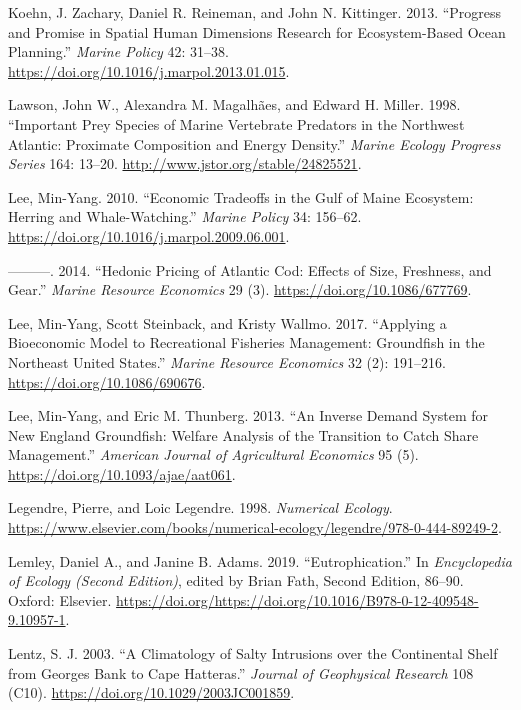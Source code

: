 \documentclass[
]{book}
\newlength{\cslhangindent}
\newenvironment{cslreferences}%
  {\setlength{\parindent}{0pt}%
  \everypar{\setlength{\hangindent}{\cslhangindent}}\ignorespaces}%
  {\par}
\begin{document}
\begin{cslreferences}
\leavevmode\hypertarget{ref-koehn_progress_2013}{}%
Koehn, J. Zachary, Daniel R. Reineman, and John N. Kittinger. 2013. ``Progress and Promise in Spatial Human Dimensions Research for Ecosystem-Based Ocean Planning.'' \emph{Marine Policy} 42: 31--38. \url{https://doi.org/10.1016/j.marpol.2013.01.015}.

\leavevmode\hypertarget{ref-lawson1998}{}%
Lawson, John W., Alexandra M. Magalhães, and Edward H. Miller. 1998. ``Important Prey Species of Marine Vertebrate Predators in the Northwest Atlantic: Proximate Composition and Energy Density.'' \emph{Marine Ecology Progress Series} 164: 13--20. \url{http://www.jstor.org/stable/24825521}.

\leavevmode\hypertarget{ref-lee_economic_2010}{}%
Lee, Min-Yang. 2010. ``Economic Tradeoffs in the Gulf of Maine Ecosystem: Herring and Whale-Watching.'' \emph{Marine Policy} 34: 156--62. \url{https://doi.org/10.1016/j.marpol.2009.06.001}.

\leavevmode\hypertarget{ref-lee_hedonic_2014}{}%
---------. 2014. ``Hedonic Pricing of Atlantic Cod: Effects of Size, Freshness, and Gear.'' \emph{Marine Resource Economics} 29 (3). \url{https://doi.org/10.1086/677769}.

\leavevmode\hypertarget{ref-lee_applying_2017}{}%
Lee, Min-Yang, Scott Steinback, and Kristy Wallmo. 2017. ``Applying a Bioeconomic Model to Recreational Fisheries Management: Groundfish in the Northeast United States.'' \emph{Marine Resource Economics} 32 (2): 191--216. \url{https://doi.org/10.1086/690676}.

\leavevmode\hypertarget{ref-lee_inverse_2013}{}%
Lee, Min-Yang, and Eric M. Thunberg. 2013. ``An Inverse Demand System for New England Groundfish: Welfare Analysis of the Transition to Catch Share Management.'' \emph{American Journal of Agricultural Economics} 95 (5). \url{https://doi.org/10.1093/ajae/aat061}.

\leavevmode\hypertarget{ref-Legendre1998}{}%
Legendre, Pierre, and Loic Legendre. 1998. \emph{Numerical Ecology}. \url{https://www.elsevier.com/books/numerical-ecology/legendre/978-0-444-89249-2}.

\leavevmode\hypertarget{ref-ospar2003}{}%
Lemley, Daniel A., and Janine B. Adams. 2019. ``Eutrophication.'' In \emph{Encyclopedia of Ecology (Second Edition)}, edited by Brian Fath, Second Edition, 86--90. Oxford: Elsevier. \url{https://doi.org/https://doi.org/10.1016/B978-0-12-409548-9.10957-1}.

\leavevmode\hypertarget{ref-lentz_climatology_2003}{}%
Lentz, S. J. 2003. ``A Climatology of Salty Intrusions over the Continental Shelf from Georges Bank to Cape Hatteras.'' \emph{Journal of Geophysical Research} 108 (C10). \url{https://doi.org/10.1029/2003JC001859}.


\end{cslreferences}
\end{document}
